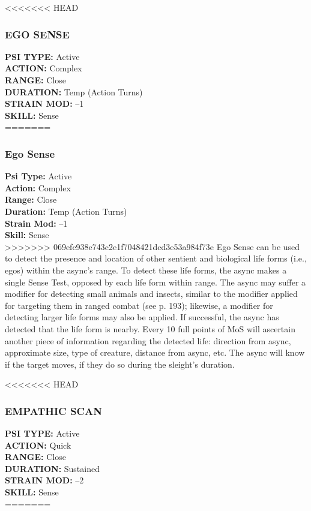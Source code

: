 <<<<<<< HEAD
\subsubsection{EGO SENSE}
\textbf{PSI TYPE:} Active \\ 
\textbf{ACTION:} Complex \\ 
\textbf{RANGE:} Close \\ 
\textbf{DURATION:} Temp (Action Turns) \\
\textbf{STRAIN MOD:} –1 \\ 
\textbf{SKILL:} Sense\\
=======
\subsubsection{Ego Sense}
\textbf{Psi Type:} Active \\ 
\textbf{Action:} Complex \\ 
\textbf{Range:} Close \\ 
\textbf{Duration:} Temp (Action Turns) \\
\textbf{Strain Mod:} –1 \\ 
\textbf{Skill:} Sense\\
>>>>>>> 069efc938e743c2e1f7048421dcd3e53a984f73e
Ego Sense can be used to detect the presence and
location of other sentient and biological life forms
(i.e., egos) within the async’s range. To detect these
life forms, the async makes a single Sense Test, opposed
by each life form within range. The async may
suffer a modifier for detecting small animals and
insects, similar to the modifier applied for targeting
them in ranged combat (see p. 193); likewise, a
modifier for detecting larger life forms may also be
applied. If successful, the async has detected that the
life form is nearby. Every 10 full points of MoS will
ascertain another piece of information regarding the
detected life: direction from async, approximate size,
type of creature, distance from async, etc. The async
will know if the target moves, if they do so during the
sleight’s duration.

<<<<<<< HEAD
\subsubsection{EMPATHIC SCAN}
\textbf{PSI TYPE:} Active \\ 
\textbf{ACTION:} Quick \\ 
\textbf{RANGE:} Close \\ 
\textbf{DURATION:} Sustained \\
\textbf{STRAIN MOD:} –2 \\ 
\textbf{SKILL:} Sense\\
=======
